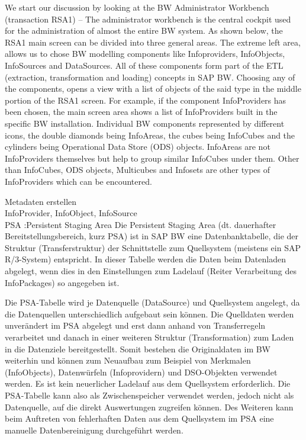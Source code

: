 We start our discussion by looking at the BW Administrator Workbench (transaction RSA1) – The administrator workbench is the central cockpit used for the administration of almost the entire BW system. As shown below, the RSA1 main screen can be divided into three general areas. The extreme left area, allows us to chose BW modelling components like Infoproviders, InfoObjects, InfoSources and DataSources. All of these components form part of the ETL (extraction, transformation and loading) concepts in SAP BW. Choosing any of the components, opens a view with a list of objects of the said type in the middle portion of the RSA1 screen. For example, if the component InfoProviders has been chosen, the main screen area shows a list of InfoProviders built in the specific BW installation. Individual BW components represented by different icons, the double diamonds being InfoAreas, the cubes being InfoCubes and the cylinders being Operational Data Store (ODS) objects. InfoAreas are not InfoProviders themselves but help to group similar InfoCubes under them. Other than InfoCubes, ODS objects, Multicubes and Infosets are other types of InfoProviders which can be encountered.



Metadaten erstellen\\
InfoProvider, InfoObject, InfoSource\\
PSA :Persistent Staging Area
Die Persistent Staging Area (dt. dauerhafter Bereitstellungsbereich, kurz PSA) ist in SAP BW eine Datenbanktabelle, die der Struktur (Transferstruktur) der Schnittstelle zum Quellsystem (meistens ein SAP R/3-System) entspricht. In dieser Tabelle werden die Daten beim Datenladen abgelegt, wenn dies in den Einstellungen zum Ladelauf (Reiter Verarbeitung des InfoPackages) so angegeben ist.

Die PSA-Tabelle wird je Datenquelle (DataSource) und Quellsystem angelegt, da die Datenquellen unterschiedlich aufgebaut sein können. Die Quelldaten werden unverändert im PSA abgelegt und erst dann anhand von Transferregeln verarbeitet und danach in einer weiteren Struktur (Transformation) zum Laden in die Datenziele bereitgestellt. Somit bestehen die Originaldaten im BW weiterhin und können zum Neuaufbau zum Beispiel von Merkmalen (InfoObjects), Datenwürfeln (Infoprovidern) und DSO-Objekten verwendet werden. Es ist kein neuerlicher Ladelauf aus dem Quellsystem erforderlich. Die PSA-Tabelle kann also als Zwischenspeicher verwendet werden, jedoch nicht als Datenquelle, auf die direkt Auswertungen zugreifen können. Des Weiteren kann beim Auftreten von fehlerhaften Daten aus dem Quellsystem im PSA eine manuelle Datenbereinigung durchgeführt werden.

